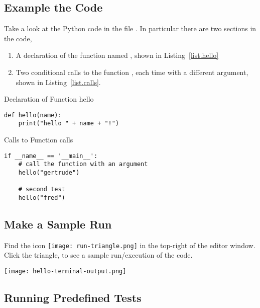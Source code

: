 \subsection{Example the Code}
Take a look at the Python code in the file .  In
particular there are two sections in the code,
\begin{enumerate}
\item A declaration of the function named , shown in
  Listing~\ref{list.hello}
\item Two conditional calls to the function , each time
  with a different argument, shown in Listing~\ref{list.calls}.
\end{enumerate}

\begin{listing}{Declaration of Function }{hello}
\begin{minipage}[c]{0.95\textwidth}\begin{lstlisting}
def hello(name):
    print("hello " + name + "!")
\end{lstlisting}\end{minipage}\end{listing}

\begin{listing}{Calls to Function }{calls}
\begin{minipage}[c]{0.95\textwidth}\begin{lstlisting}
if __name__ == '__main__':
    # call the function with an argument
    hello("gertrude")
    
    # second test
    hello("fred")
\end{lstlisting}\end{minipage}\end{listing}


\subsection{Make a Sample Run}

Find the icon \texttt{[image: run-triangle.png]} in the
top-right of the editor window.  Click the triangle, to see a sample
run/execution of the code.

\noindent\texttt{[image: hello-terminal-output.png]}


\subsection{Running Predefined Tests}
\label{sec.run.tests}

